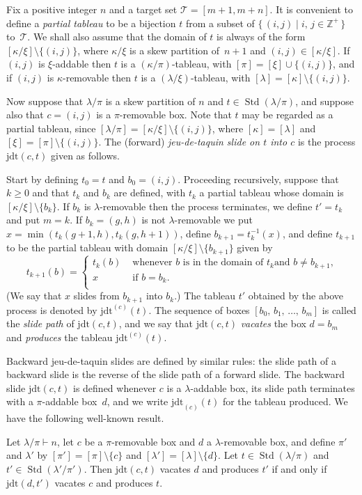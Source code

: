 \documentclass[ALCO,ThmDefs,Unicode,epreuves]{cedram}
\newcommand{\jdt}{\mathrm{jdt}}
\DeclareMathOperator{\STD}{Std}
\begin{document}
Fix a positive integer $n$ and a target set $\mathcal{T}=[m+1,m+n]$. It
is convenient to define a \emph{partial tableau} to be a bijection $t$
from a subset of $\{\,(i,j)\mid i,\,j\in\mathbb{Z}^+\,\}$ to~$\mathcal{T}$.
We shall also assume that the domain of $t$ is always of the form
$[\kappa/\xi]\setminus\{(i,j)\}$, where $\kappa/\xi$ is a skew partition
of~$n+1$ and $(i,j)\in[\kappa/\xi]$. If $(i,j)$ is $\xi$-addable
then $t$ is a $(\kappa/\pi)$-tableau, with
$[\pi]=[\xi]\cup\{(i,j)\}$, and if $(i,j)$ is $\kappa$-removable
then $t$ is a $(\lambda/\xi)$-tableau, with
$[\lambda]=[\kappa]\setminus\{(i,j)\}$.

Now suppose that $\lambda/\pi$ is a skew partition of $n$ and
$t\in\STD(\lambda/\pi)$, and suppose also that $c=(i,j)$
is a $\pi$-removable box.
Note that $t$ may be regarded as a partial tableau, since
$[\lambda/\pi]=[\kappa/\xi]\setminus\{(i,j)\}$, where
$[\kappa]=[\lambda]$ and $[\xi]=[\pi]\setminus\{(i,j)\}$.
The (forward) \emph{jeu-de-taquin slide on $t$ into $c$} is the
process $\jdt(c,t)$ given as follows.

Start by defining $t_0=t$ and $b_0 = (i,j)$. Proceeding recursively,
suppose that $k\geqslant 0$ and that $t_{k}$
and $b_{k}$ are defined, with $t_{k}$ a partial tableau whose
domain is $[\kappa/\xi]\setminus\{b_{k}\}$. If $b_{k}$ is
$\lambda$-removable then the process terminates, we define
$t'=t_{k}$ and put $m=k$. If $b_{k}=(g,h)$ is not
$\lambda$-removable we put $x=\min(t_k(g+1,h),t_k(g,h+1))$, define
$b_{k+1}=t_{k}^{-1}(x)$, and define $t_{k+1}$ to be the partial
tableau with domain $[\kappa/\xi]\setminus\{b_{k+1}\}$ given by
\[
t_{k+1}(b)=
\begin{cases}t_{k}(b)&\text{ whenever $b$ is in the domain of $t_{k}$
and $b\ne b_{k+1}$,}\\
x&\text{ if $b=b_{k}$.}\\
\end{cases}
\]
(We say that $x$ slides from $b_{k+1}$ into $b_{k}$.)
The tableau $t'$ obtained by the above process is denoted by $\jdt^{(c)}(t)$.
The sequence of boxes $[b_0,\,b_1,\,\ldots,\,b_m]$
is called the \emph{slide path} of $\jdt(c,t)$, and we say that
$\jdt(c,t)$ \emph{vacates} the box $d=b_m$ and \emph{produces}
the tableau $\jdt^{(c)}(t)$.

Backward jeu-de-taquin slides are defined by similar rules: the slide path of a backward
slide is the reverse of the slide path of a forward slide. The backward slide $\jdt(c,t)$
is defined whenever $c$ is a $\lambda$-addable box, its slide path terminates with
a $\pi$-addable box~$d$, and we write $\jdt_{(c)}(t)$ for the tableau produced.
We have the following well-known result.
\begin{prop}\label{forwardbackward}
Let $\lambda/\pi\vdash n$, let $c$ be a $\pi$-removable box and $d$ a
$\lambda$-removable box, and define $\pi'$ and $\lambda'$ by
$[\pi']=[\pi]\setminus\{c\}$ and $[\lambda']=[\lambda]\setminus\{d\}$.
Let $t\in\STD(\lambda/\pi)$ and $t'\in\STD(\lambda'/\pi')$. Then
$\jdt(c,t)$ vacates $d$ and produces $t'$ if and only if
$\jdt(d,t')$ vacates $c$ and produces $t$.
\end{prop}
\end{document}
